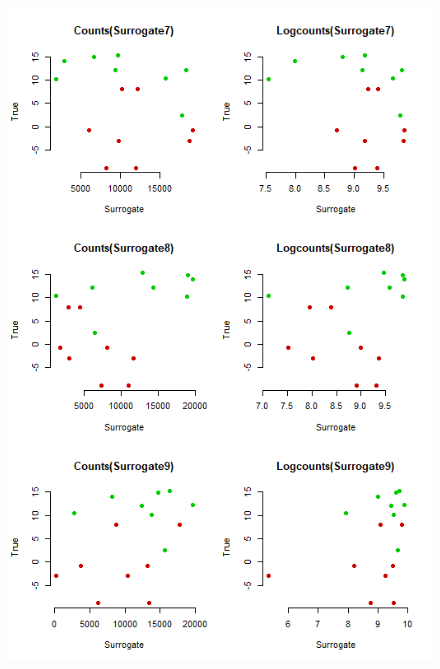 \documentclass[a4paper,12pt]{article}
\begin{document}
\begin{figure}[H]
\begin{minipage}{0.5\textwidth}
			\includegraphics[scale=0.45]{exploration-3.png}
		\end{minipage}
	\end{figure}
	
\end{document}
